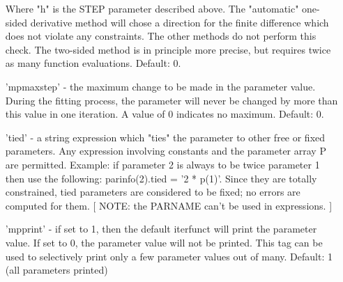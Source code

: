 \begin{itemize}
        Where "h" is the STEP parameter described above.  The
        "automatic" one-sided derivative method will chose a
        direction for the finite difference which does not
        violate any constraints.  The other methods do not
        perform this check.  The two-sided method is in
        principle more precise, but requires twice as many
        function evaluations.  Default: 0.

    \item['mpmaxstep' -] the maximum change to be made in the parameter
        value.  During the fitting process, the parameter
        will never be changed by more than this value in
        one iteration. A value of 0 indicates no maximum.  Default: 0.

    \item['tied' -] a string expression which "ties" the parameter to other
        free or fixed parameters.  Any expression involving
        constants and the parameter array P are permitted.
        Example: if parameter 2 is always to be twice parameter
        1 then use the following: parinfo(2).tied = '2 * p(1)'.
        Since they are totally constrained, tied parameters are
        considered to be fixed; no errors are computed for them.
        [ NOTE: the PARNAME can't be used in expressions. ]

    \item['mpprint' -] if set to 1, then the default iterfunct will print the
        parameter value.  If set to 0, the parameter value
        will not be printed.  This tag can be used to
        selectively print only a few parameter values out of
        many.  Default: 1 (all parameters printed)
\end{itemize}
